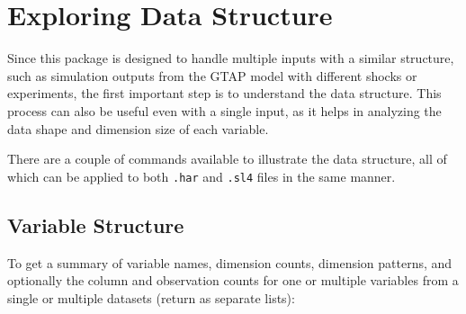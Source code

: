 \documentclass[
]{article}
\begin{document}
\section{Exploring Data Structure}\label{exploring-data-structure}

Since this package is designed to handle multiple inputs with a similar
structure, such as simulation outputs from the GTAP model with different
shocks or experiments, the first important step is to understand the
data structure. This process can also be useful even with a single
input, as it helps in analyzing the data shape and dimension size of
each variable.

There are a couple of commands available to illustrate the data
structure, all of which can be applied to both \texttt{.har} and
\texttt{.sl4} files in the same manner.

\subsection{Variable Structure}\label{variable-structure}

To get a summary of variable names, dimension counts, dimension
patterns, and optionally the column and observation counts for one or
multiple variables from a single or multiple datasets (return as
separate lists):
\end{document}
